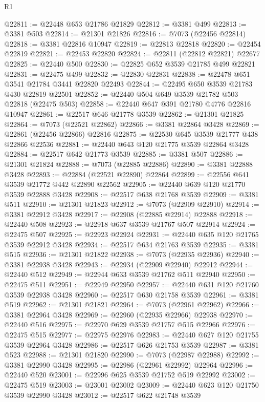 \begin{lexlean}{R1}
\begin{coremodule}
@22811 := @22448 @653 @21786 @21829
@22812 := @3381 @499
@22813 := @3381 @503
@22814 := @21301 @21826
@22816 := @7073 (@22456 @22814)
@22818 := @3381 @22816 @10947
@22819 := @22813 @22818
@22820 := @22454 @22819
@22821 := @22453 @22820
@22824 := @22811 (@22812 @22821) @22677
@22825 := @22440 @500
@22830 := @22825 @652 @3539 @21785 @499 @22821
@22831 := @22475 @499
@22832 := @22830 @22831
@22838 := @22478 @651 @3541 @21784 @3441 @22820 @22493
@22844 := @22495 @650 @3539 @21783 @430 @22819 @22501
@22852 := @22440 @504 @649 @3539 @21782 @503 @22818 (@22475 @503)
@22858 := @22440 @647 @391 @21780 @4776 @22816 @10947
@22861 := @22517 @646 @21778 @3539
@22862 := @21301 @21825
@22864 := @7073 (@22521 @22862)
@22866 := @3381 @22864 @3428
@22869 := @22861 (@22456 @22866) @22816
@22875 := @22530 @645 @3539 @21777 @438 @22866 @22536
@22881 := @22440 @643 @120 @21775 @3539 @22864 @3428
@22884 := @22517 @642 @21773 @3539
@22885 := @3381 @507
@22886 := @21301 @21824
@22888 := @7073 (@22885 @22886)
@22890 := @3381 @22888 @3428
@22893 := @22884 (@22521 @22890) @22864
@22899 := @22556 @641 @3539 @21772 @442 @22890 @22562
@22905 := @22440 @639 @120 @21770 @3539 @22888 @3428
@22908 := @22517 @638 @21768 @3539
@22909 := @3381 @511
@22910 := @21301 @21823
@22912 := @7073 (@22909 @22910)
@22914 := @3381 @22912 @3428
@22917 := @22908 (@22885 @22914) @22888
@22918 := @22440 @508
@22923 := @22918 @637 @3539 @21767 @507 @22914
@22924 := @22475 @507
@22925 := @22923 @22924
@22931 := @22440 @635 @120 @21765 @3539 @22912 @3428
@22934 := @22517 @634 @21763 @3539
@22935 := @3381 @515
@22936 := @21301 @21822
@22938 := @7073 (@22935 @22936)
@22940 := @3381 @22938 @3428
@22943 := @22934 (@22909 @22940) @22912
@22944 := @22440 @512
@22949 := @22944 @633 @3539 @21762 @511 @22940
@22950 := @22475 @511
@22951 := @22949 @22950
@22957 := @22440 @631 @120 @21760 @3539 @22938 @3428
@22960 := @22517 @630 @21758 @3539
@22961 := @3381 @519
@22962 := @21301 @21821
@22964 := @7073 (@22961 @22962)
@22966 := @3381 @22964 @3428
@22969 := @22960 (@22935 @22966) @22938
@22970 := @22440 @516
@22975 := @22970 @629 @3539 @21757 @515 @22966
@22976 := @22475 @515
@22977 := @22975 @22976
@22983 := @22440 @627 @120 @21755 @3539 @22964 @3428
@22986 := @22517 @626 @21753 @3539
@22987 := @3381 @523
@22988 := @21301 @21820
@22990 := @7073 (@22987 @22988)
@22992 := @3381 @22990 @3428
@22995 := @22986 (@22961 @22992) @22964
@22996 := @22440 @520
@23001 := @22996 @625 @3539 @21752 @519 @22992
@23002 := @22475 @519
@23003 := @23001 @23002
@23009 := @22440 @623 @120 @21750 @3539 @22990 @3428
@23012 := @22517 @622 @21748 @3539

\end{coremodule}
\end{lexlean}
